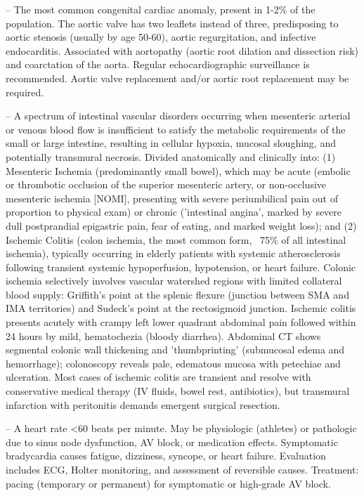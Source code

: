 -- The most common congenital cardiac anomaly, present in 1-2\% of the population. The aortic valve has two leaflets instead of three, predisposing to aortic stenosis (usually by age 50-60), aortic regurgitation, and infective endocarditis. Associated with aortopathy (aortic root dilation and dissection risk) and coarctation of the aorta. Regular echocardiographic surveillance is recommended. Aortic valve replacement and/or aortic root replacement may be required.

-- A spectrum of intestinal vascular disorders occurring when mesenteric arterial or venous blood flow is insufficient to satisfy the metabolic requirements of the small or large intestine, resulting in cellular hypoxia, mucosal sloughing, and potentially transmural necrosis. Divided anatomically and clinically into: (1) Mesenteric Ischemia (predominantly small bowel), which may be acute (embolic or thrombotic occlusion of the superior mesenteric artery, or non-occlusive mesenteric ischemia [NOMI], presenting with severe periumbilical pain out of proportion to physical exam) or chronic ('intestinal angina', marked by severe dull postprandial epigastric pain, fear of eating, and marked weight loss); and (2) Ischemic Colitis (colon ischemia, the most common form, ~75\% of all intestinal ischemia), typically occurring in elderly patients with systemic atherosclerosis following transient systemic hypoperfusion, hypotension, or heart failure. Colonic ischemia selectively involves vascular watershed regions with limited collateral blood supply: Griffith's point at the splenic flexure (junction between SMA and IMA territories) and Sudeck's point at the rectosigmoid junction. Ischemic colitis presents acutely with crampy left lower quadrant abdominal pain followed within 24 hours by mild, hematochezia (bloody diarrhea). Abdominal CT shows segmental colonic wall thickening and 'thumbprinting' (submucosal edema and hemorrhage); colonoscopy reveals pale, edematous mucosa with petechiae and ulceration. Most cases of ischemic colitis are transient and resolve with conservative medical therapy (IV fluids, bowel rest, antibiotics), but transmural infarction with peritonitis demands emergent surgical resection.

-- A heart rate <60 beats per minute. May be physiologic (athletes) or pathologic due to sinus node dysfunction, AV block, or medication effects. Symptomatic bradycardia causes fatigue, dizziness, syncope, or heart failure. Evaluation includes ECG, Holter monitoring, and assessment of reversible causes. Treatment: pacing (temporary or permanent) for symptomatic or high-grade AV block.

